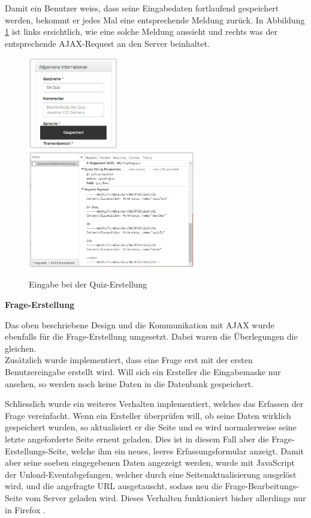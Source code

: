 Damit ein Benutzer weiss, dass seine Eingabedaten fortlaufend gespeichert werden, bekommt er jedes Mal eine entsprechende Meldung zurück. In Abbildung \ref{fig:Eingabe bei der Quiz-Erstellung} ist links ersichtlich, wie eine solche Meldung aussieht und rechts was der entsprechende \acrshort{AJAX}-Request an den Server beinhaltet.


\begin{figure}
	\includegraphics[width=0.35\textwidth]{Images/Quiz_Erstellen_Gespeichert.PNG}
	\includegraphics[width=0.65\textwidth]{Images/Quiz_Erstellen_Request.PNG}
	\caption{Eingabe bei der Quiz-Erstellung}
	\label{fig:Eingabe bei der Quiz-Erstellung}
\end{figure}

\bigskip\bigskip

\textbf{Frage-Erstellung}

\bigskip

Das oben beschriebene Design und die Kommunikation mit \acrshort{AJAX} wurde ebenfalls für die Frage-Erstellung umgesetzt. Dabei waren die Überlegungen die gleichen. \\

Zusätzlich wurde implementiert, dass eine Frage erst mit der ersten Benutzereingabe erstellt wird. Will sich ein Ersteller die Eingabemaske nur ansehen, so werden noch keine Daten in die Datenbank gespeichert.

Schliesslich wurde ein weiteres Verhalten implementiert, welches das Erfassen der Frage vereinfacht. Wenn ein Ersteller überprüfen will, ob seine Daten wirklich gespeichert wurden, so aktualisiert er die Seite und es wird normalerweise seine letzte angeforderte Seite erneut geladen. Dies ist in diesem Fall aber die Frage-Erstellungs-Seite, welche ihm ein neues, leeres Erfassungsformular anzeigt. Damit aber seine soeben eingegebenen Daten angezeigt werden, wurde mit JavaScript der \glqq Unload-Event\grqq abgefangen, welcher durch eine Seitenaktualisierung ausgelöst wird, und die angefragte \gls{URL} ausgetauscht, sodass neu die Frage-Bearbeitungs-Seite vom Server geladen wird.
Dieses Verhalten funktioniert bisher allerdings nur in Firefox \cite{firefox}.



